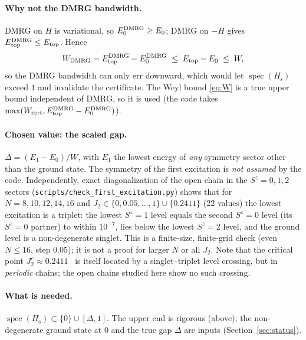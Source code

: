 \documentclass[11pt]{article}
\theoremstyle{definition}
\newcommand{\Hs}{H_{\mathrm s}}
\begin{document}
\paragraph{Why not the DMRG bandwidth.} DMRG on $H$ is variational, so $E_0^{\rm DMRG}\ge E_0$; DMRG on $-H$ gives
$E_{\rm top}^{\rm DMRG}\le E_{\rm top}$. Hence
\[
  W_{\rm DMRG}=E_{\rm top}^{\rm DMRG}-E_0^{\rm DMRG}\;\le\;E_{\rm top}-E_0\;\le\;W ,
\]
so the DMRG bandwidth can only err downward, which would let $\operatorname{spec}(\Hs)$ exceed $1$ and invalidate the
certificate. The Weyl bound \eqref{eq:W} is a true upper bound independent of DMRG, so it is used (the code takes
$\max(W_{\rm cert},E_{\rm top}^{\rm DMRG}-E_0^{\rm DMRG})$).

\paragraph{Chosen value: the scaled gap.} $\Delta=(E_1-E_0)/W$, with $E_1$ the lowest energy of \emph{any} symmetry
sector other than the ground state. The symmetry of the first excitation is \emph{not assumed} by the code. Independently,
exact diagonalization of the open chain in the $S^z=0,1,2$ sectors (\texttt{scripts/check\_first\_excitation.py}) shows that for
$N=8,10,12,14,16$ and $J_2\in\{0,0.05,\dots,1\}\cup\{0.2411\}$ (22 values) the lowest excitation is a triplet: the lowest $S^z=1$ level
equals the second $S^z=0$ level (its $S^z=0$ partner) to within $10^{-7}$, lies below the lowest $S^z=2$ level, and the ground level is a
non-degenerate singlet. This is a finite-size, finite-grid check (even $N\le16$, step $0.05$); it is not a proof for larger $N$ or all $J_2$.
Note that the critical point $J_2^c\approx0.2411$~\cite{eggert,okamoto} is itself located by a singlet--triplet level crossing, but in
\emph{periodic} chains; the open chains studied here show no such crossing.

\paragraph{What is needed.} $\operatorname{spec}(\Hs)\subset\{0\}\cup[\Delta,1]$. The upper end is rigorous (above); the
non-degenerate ground state at $0$ and the true gap $\Delta$ are inputs (Section~\ref{sec:status}).
\end{document}
